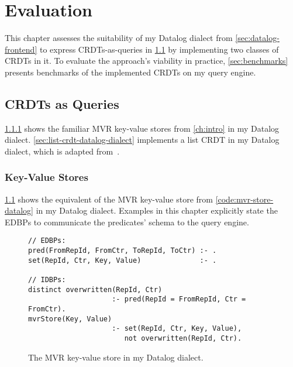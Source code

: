 
\chapter{Evaluation}\label{ch:evaluation}

This chapter assesses the suitability of my Datalog dialect from
\ref{sec:datalog-frontend} to express \acp{CRDT}-as-queries
in \ref{sec:crdts-as-queries} by implementing two classes of \acp{CRDT} in it.
To evaluate the approach's viability in practice,
\ref{sec:benchmarks} presents benchmarks of the implemented \acp{CRDT}
on my query engine.

\section{\acp{CRDT} as Queries}\label{sec:crdts-as-queries}

\ref{sec:key-value-stores-datalog-dialect} shows the familiar \ac{MVR} key-value
stores from \ref{ch:intro} in my Datalog dialect.
\ref{sec:list-crdt-datalog-dialect} implements a list \ac{CRDT} in my Datalog
dialect, which is adapted from~\cite{kleppmann2018data}.

\subsection{Key-Value Stores}\label{sec:key-value-stores-datalog-dialect}

\ref{code:mvr-store-datalog-dialect} shows the equivalent of the \ac{MVR}
key-value store from \ref{code:mvr-store-datalog} in my Datalog dialect.
Examples in this chapter explicitly state the \acp{EDBP} to communicate the
predicates' schema to the query engine.

\begin{figure}[htpb]
	\begin{lstlisting}[keepspaces]
// EDBPs:
pred(FromRepId, FromCtr, ToRepId, ToCtr) :- .
set(RepId, Ctr, Key, Value)              :- .

// IDBPs:
distinct overwritten(RepId, Ctr)
                    :- pred(RepId = FromRepId, Ctr = FromCtr).
mvrStore(Key, Value)
                    :- set(RepId, Ctr, Key, Value),
                       not overwritten(RepId, Ctr).\end{lstlisting}
	\caption{The \ac{MVR} key-value store in my Datalog dialect.}\label{code:mvr-store-datalog-dialect}
\end{figure}

